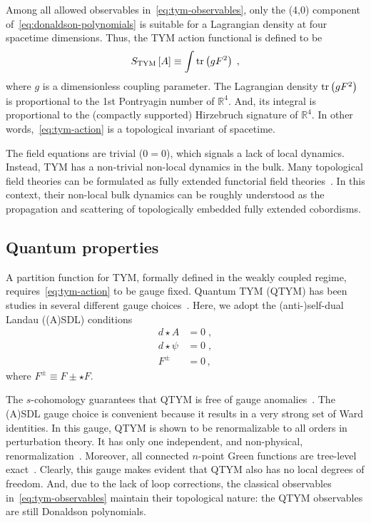\documentclass[main.tex]{subfiles}
\begin{document}
Among all allowed observables in~\eqref{eq:tym-observables}, only the (4,0) component of~\eqref{eq:donaldson-polynomials} is suitable for a Lagrangian density at four spacetime dimensions. Thus, the TYM action functional is defined to be
\begin{equation}\label{eq:tym-action}
  S_{\text{TYM}}\left[ A \right] \equiv  \int\operatorname{tr}\left( g F^2\right) \;,
\end{equation}
where $ g $ is a dimensionless coupling parameter. The Lagrangian density $\operatorname{tr} \left(g F^2 \right)$ is proportional to the 1st Pontryagin number of $\mathbb{R}^4$. And, its integral is proportional to the (compactly supported) Hirzebruch signature of $\mathbb{R}^4$. In other words,~\eqref{eq:tym-action} is a topological  invariant of spacetime.

The field equations are trivial ($0=0$), which signals a lack of local dynamics. Instead, TYM has a non-trivial non-local dynamics in the bulk. Many topological field theories can be formulated as fully extended functorial field theories~\cite{atiyah1988a,segal1988a,baez1995a,schreiber2009a,baez2009a}. In this context, their non-local bulk dynamics can be roughly understood as the propagation and scattering of topologically embedded fully extended cobordisms.

\subsection{Quantum properties}\label{ssec:quantum-properties;sec:tym}

A partition function for TYM, formally defined in the weakly coupled regime, requires~\eqref{eq:tym-action} to be gauge fixed. Quantum TYM (QTYM) has been studies in several different gauge choices~\cite{baulieu1988a,myers1990c,brandhuber1994a,piguet1995a,sadovski2017c,sadovski2018a,sadovski2018b}. Here, we adopt the (anti-){}self-dual Landau ((A){}SDL) conditions
\begin{subequations}\label{eq:asdlg}
  \begin{align}
    d \star A    & = 0 \;, \\
    d \star \psi & = 0 \;, \\
    F^{\pm}      & = 0 \,,
  \end{align}
\end{subequations}
where $ F^{\pm} \equiv F \pm \star F $.

The $ s $-cohomology guarantees that QTYM is free of gauge anomalies~\cite{baulieu1988a}. The (A){}SDL gauge choice is convenient because it results in a very strong set of Ward identities. In this gauge, QTYM is shown to be renormalizable to all orders in perturbation theory. It has only one independent, and non-physical, renormalization~\cite{sadovski2017c}. Moreover, all connected $n$-point Green functions are tree-level exact~\cite{sadovski2018a}. Clearly, this gauge makes evident that QTYM also has no local degrees of freedom. And, due to the lack of loop corrections, the classical observables in~\eqref{eq:tym-observables} maintain their topological nature: the QTYM observables are still Donaldson polynomials.
\end{document}
